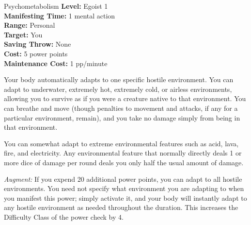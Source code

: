 {Psychometabolism}
{
	\textbf{Level:}
	Egoist 1\\
	\textbf{Manifesting Time:}
	1 mental action\\
	\textbf{Range:}
	Personal\\
	\textbf{Target:}
	You\\
	\textbf{Saving Throw:}
	None\\
	\textbf{Cost:}
	5 power points\\
	\textbf{Maintenance Cost:}
	1 pp/minute\\
}
{
	Your body automatically adapts to one specific hostile environment. You can adapt to underwater, extremely hot, extremely cold, or airless environments, allowing you to survive as if you were a creature native to that environment. You can breathe and move (though penalties to movement and attacks, if any for a particular environment, remain), and you take no damage simply from being in that environment.

	You can somewhat adapt to extreme environmental features such as acid, lava, fire, and electricity. Any environmental feature that normally directly deals 1 or more dice of damage per round deals you only half the usual amount of damage.

	\textit{Augment:} If you expend 20 additional power points, you can adapt to all hostile environments. You need not specify what environment you are adapting to when you manifest this power; simply activate it, and your body will instantly adapt to any hostile environment as needed throughout the duration. This increases the Difficulty Class of the power check by 4.
}